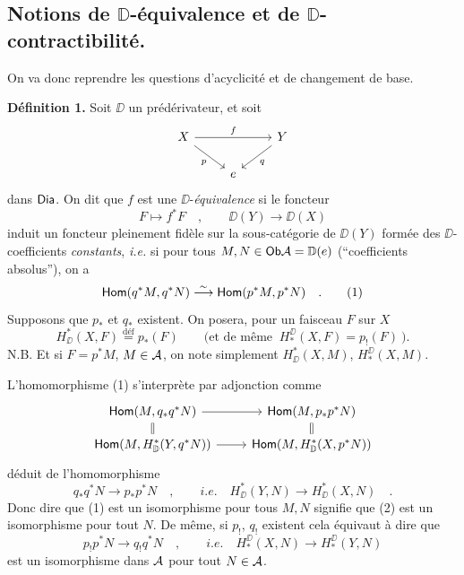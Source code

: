 \subsection*{Notions de $\mathbb{D}$-équivalence et de $\mathbb{D}$-contractibilité.}

On va donc reprendre les questions d'acyclicité et de changement de base.

\noindent\textbf{Définition 1.} Soit $\DD$ un prédérivateur, et soit
\[
\begin{tikzcd}
X \arrow[rr, "f"] \arrow[dr, "p"'] & & Y \arrow[dl, "q"] \\
& e &
\end{tikzcd}
\]
dans $\mathsf{Dia}$. On dit que $f$ est une $\DD$-\textit{équivalence} si le foncteur
\[
F \longmapsto f^*F \quad , \qquad \DD(Y) \longrightarrow \DD(X)
\]
induit un foncteur pleinement fidèle sur la sous-catégorie de $\DD(Y)$ formée des $\DD$-coefficients \textit{constants}, \textit{i.e.} si pour tous $M, N \in \mathsf{Ob} \mathcal{A} = \mathbb{D}(e)$ (“coefficients absolus”), on a
\[
\mathsf{Hom}(q^*M, q^*N) \overset{\sim}{\longrightarrow} \mathsf{Hom}(p^*M, p^*N) \quad . \tag*{(1)}
\]
Supposons que $p_*$ et $q_*$ existent. On posera, pour un faisceau $F$ sur $X$
\[
H^*_{\DD}(X, F) \overset{\text{déf}}{=} p_*(F) \qquad \text{(et de même } \ H^{\DD}_*(X, F) = p_!(F) \ \text{).}
\]
N.B. Et si $F = p^*M$, $M \in \mathcal{A}$, on note simplement $H^*_{\DD}(X, M)$, $H^{\DD}_*(X, M)$.

\noindent L'homomorphisme (1) s'interprète par adjonction comme
\[
\begin{tikzcd}[row sep=small]
\sHom(M, q_*q^*N) \arrow[r] \arrow[d, equal] & \sHom(M, p_*p^*N) \arrow[d, equal] \\
\sHom(M, H^*_{\DD}(Y, q^*N)) \arrow[r] & \sHom(M, H^*_{\DD}(X, p^*N))
\end{tikzcd}
\]
déduit de l'homomorphisme
\[
q_*q^*N \longrightarrow p_*p^*N \quad , \qquad \textit{i.e.} \quad H^*_{\DD}(Y, N) \longrightarrow H^*_{\DD}(X, N) \quad . \tag*{(2)}
\]
Donc dire que (1) est un isomorphisme pour tous $M, N$ signifie que (2) est un isomorphisme pour tout $N$. De même, si $p_!$, $q_!$ existent cela équivaut à dire que
\[
p_!p^*N \longrightarrow q_!q^*N \quad , \qquad \textit{i.e.} \quad H^{\DD}_*(X, N) \longrightarrow H^{\DD}_*(Y, N) \tag*{$(2')$}
\]
est un isomorphisme dans $\mathcal{A}$ pour tout $N \in \mathcal{A}$.

\clearpage
{}
\noindent{}

